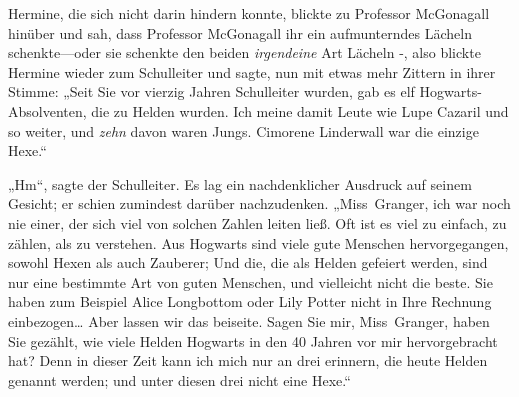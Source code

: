 Hermine, die sich nicht darin hindern konnte, blickte zu Professor McGonagall hinüber und sah, dass Professor McGonagall ihr ein aufmunterndes Lächeln schenkte—oder sie schenkte den beiden \emph{irgendeine} Art Lächeln -, also blickte Hermine wieder zum Schulleiter und sagte, nun mit etwas mehr Zittern in ihrer Stimme: „Seit Sie vor vierzig Jahren Schulleiter wurden, gab es elf Hogwarts-Absolventen, die zu Helden wurden. Ich meine damit Leute wie Lupe Cazaril und so weiter, und \emph{zehn} davon waren Jungs. Cimorene Linderwall war die einzige Hexe.“

„Hm“, sagte der Schulleiter. Es lag ein nachdenklicher Ausdruck auf seinem Gesicht; er schien zumindest darüber nachzudenken. „Miss~Granger, ich war noch nie einer, der sich viel von solchen Zahlen leiten ließ. Oft ist es viel zu einfach, zu zählen, als zu verstehen. Aus Hogwarts sind viele gute Menschen hervorgegangen, sowohl Hexen als auch Zauberer; Und die, die als Helden gefeiert werden, sind nur eine bestimmte Art von guten Menschen, und vielleicht nicht die beste. Sie haben zum Beispiel Alice Longbottom oder Lily Potter nicht in Ihre Rechnung einbezogen… Aber lassen wir das beiseite. Sagen Sie mir, Miss~Granger, haben Sie gezählt, wie viele Helden Hogwarts in den 40 Jahren vor mir hervorgebracht hat? Denn in dieser Zeit kann ich mich nur an drei erinnern, die heute Helden genannt werden; und unter diesen drei nicht eine Hexe.“

